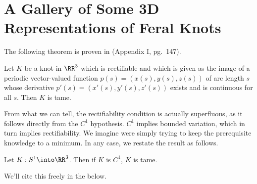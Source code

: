 \chapter{A Gallery of Some 3D Representations of Feral
  Knots}\label{chap:feral-gallery}
\def\figdir{figures/feral-gallery}
\def\otherfigdir{figures/unknotting-moves-and-combinatorial-representations}
The following theorem is proven in \cite{Crowell1963} (Appendix I,
pg.\ 147).
\begin{theorem}\label{thm:c1-suffices}
  Let $K$ be a knot in $\RR^3$ which is rectifiable and which is given
  as the image of a periodic vector-valued function $p(s) = (x(s),
  y(s), z(s))$ of arc length $s$ whose derivative $p'(s) = (x'(s),
  y'(s), z'(s))$ exists and is continuous for all $s$. Then $K$ is
  tame.
\end{theorem}
From what we can tell, the rectifiability condition is actually
superfluous, as it follows directly from the $C^1$ hypothesis. $C^1$
implies bounded variation, which in turn implies rectifiability. We
imagine \cite{Crowell1963} were simply trying to keep the prerequisite
knowledge to a minimum. In any case, we restate the result as follows.
\begin{theorem}
  Let $K : S^1\into \RR^3$. Then if $K$ is $C^1$, $K$ is tame.
\end{theorem}
We'll cite this freely in the below.



